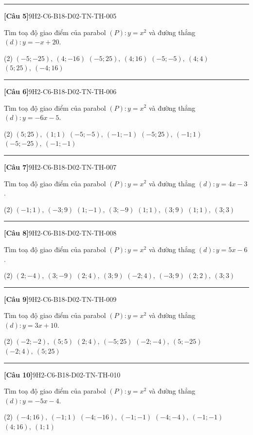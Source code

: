 \documentclass[12pt,a4paper]{article}
\newif\ifloigiai
\newenvironment{cauhoi}[2]{%
  \par\medskip\noindent\rule{\textwidth}{0.4pt}\par\nopagebreak
  \noindent\textbf{[#1]}\hfill{\scriptsize\ttfamily #2}\par\nopagebreak\smallskip}{\par}
\newcommand{\dapan}[1]{\ifloigiai\par\smallskip\noindent\textit{Đáp án:} \textbf{#1}\par\fi}
\begin{document}
\begin{cauhoi}{Câu 5}{9H2-C6-B18-D02-TN-TH-005}
Tìm toạ độ giao điểm của parabol $(P): y=x^{2}$ và đường thẳng $(d): y=-x+20$.
\begin{tasks}(2)
\task $(-5;-25),\ (4;-16)$
\task $(-5;25),\ (4;16)$
\task $(-5;-5),\ (4;4)$
\task $(5;25),\ (-4;16)$
\end{tasks}
\dapan{B}
\end{cauhoi}
\begin{cauhoi}{Câu 6}{9H2-C6-B18-D02-TN-TH-006}
Tìm toạ độ giao điểm của parabol $(P): y=x^{2}$ và đường thẳng $(d): y=-6x-5$.
\begin{tasks}(2)
\task $(5;25),\ (1;1)$
\task $(-5;-5),\ (-1;-1)$
\task $(-5;25),\ (-1;1)$
\task $(-5;-25),\ (-1;-1)$
\end{tasks}
\dapan{C}
\end{cauhoi}
\begin{cauhoi}{Câu 7}{9H2-C6-B18-D02-TN-TH-007}
Tìm toạ độ giao điểm của parabol $(P): y=x^{2}$ và đường thẳng $(d): y=4x-3$.
\begin{tasks}(2)
\task $(-1;1),\ (-3;9)$
\task $(1;-1),\ (3;-9)$
\task $(1;1),\ (3;9)$
\task $(1;1),\ (3;3)$
\end{tasks}
\dapan{C}
\end{cauhoi}
\begin{cauhoi}{Câu 8}{9H2-C6-B18-D02-TN-TH-008}
Tìm toạ độ giao điểm của parabol $(P): y=x^{2}$ và đường thẳng $(d): y=5x-6$.
\begin{tasks}(2)
\task $(2;-4),\ (3;-9)$
\task $(2;4),\ (3;9)$
\task $(-2;4),\ (-3;9)$
\task $(2;2),\ (3;3)$
\end{tasks}
\dapan{B}
\end{cauhoi}
\begin{cauhoi}{Câu 9}{9H2-C6-B18-D02-TN-TH-009}
Tìm toạ độ giao điểm của parabol $(P): y=x^{2}$ và đường thẳng $(d): y=3x+10$.
\begin{tasks}(2)
\task $(-2;-2),\ (5;5)$
\task $(2;4),\ (-5;25)$
\task $(-2;-4),\ (5;-25)$
\task $(-2;4),\ (5;25)$
\end{tasks}
\dapan{D}
\end{cauhoi}
\begin{cauhoi}{Câu 10}{9H2-C6-B18-D02-TN-TH-010}
Tìm toạ độ giao điểm của parabol $(P): y=x^{2}$ và đường thẳng $(d): y=-5x-4$.
\begin{tasks}(2)
\task $(-4;16),\ (-1;1)$
\task $(-4;-16),\ (-1;-1)$
\task $(-4;-4),\ (-1;-1)$
\task $(4;16),\ (1;1)$
\end{tasks}
\dapan{A}
\end{cauhoi}
\end{document}

